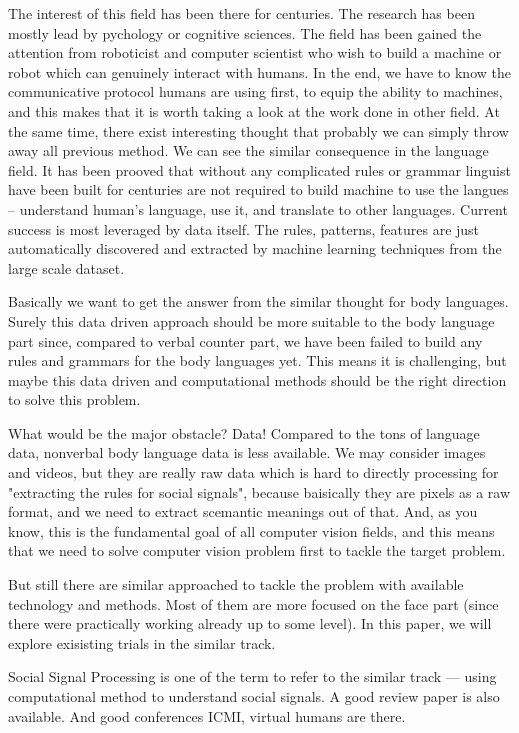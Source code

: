 The interest of this field has been there for centuries. The research has been mostly lead by pychology or cognitive sciences. The field has been gained the attention from roboticist and computer scientist who wish to build a machine or robot which can genuinely interact with humans.  In the end, we have to know the communicative protocol humans are using first, to equip the ability to machines, and this makes that it is worth taking a look at the work done in other field. At the same time, there exist interesting thought that probably we can simply throw away all previous method. We can see the similar consequence in the language field. It has been prooved that without any complicated rules or grammar linguist have been built for centuries are not required to build machine to use the langues -- understand human's language, use it, and translate to other languages. Current success is most leveraged by data itself. The rules, patterns, features are just automatically discovered and extracted by machine learning techniques from the large scale dataset. 

Basically we want to get the answer from the similar thought for body languages. Surely this data driven approach should be more suitable to the body language part since, compared to verbal counter part, we have been failed to build any rules and grammars for the body languages yet. This means it is challenging, but maybe this data driven and computational methods should be the right direction to solve this problem. 

What would be the major obstacle? Data! Compared to the tons of language data, nonverbal body language data is less available. We may consider images and videos, but they are really raw data which is hard to directly processing for "extracting the rules for social signals", because baisically they are pixels as a raw format, and we need to extract scemantic meanings out of that. And, as you know, this is the fundamental goal of all computer vision fields, and this means that we need to solve computer vision problem first to tackle the target problem. 

But still there are similar approached to tackle the problem with available technology and methods. Most of them are more focused on the face part (since there were practically working already up to some level). In this paper, we will explore exisisting trials in the similar track. 



Social Signal Processing is one of the term to refer to the similar track --- using computational method to understand social signals. A good review paper is also available. And good conferences ICMI, virtual humans are there. 




